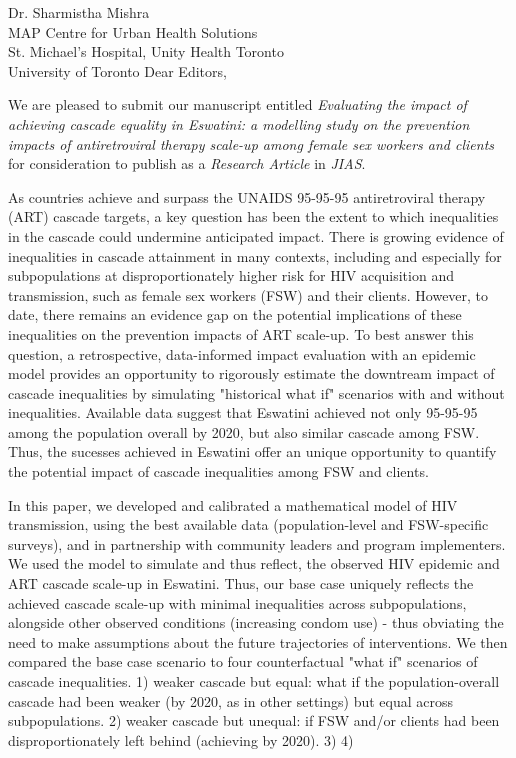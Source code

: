 \address{
  Prof. Kenneth H. Mayer \& Dr. Annette Sohn\\
  Editors-in-Chief\\
  Journal of the International AIDS Society
}{Dr. Sharmistha Mishra\\
  MAP Centre for Urban Health Solutions\\
  St. Michael's Hospital, Unity Health Toronto\\
  University of Toronto}
Dear Editors,
\par
We are pleased to submit our manuscript entitled
\emph{Evaluating the impact of achieving cascade equality in Eswatini:
 a modelling study on the prevention impacts of antiretroviral therapy scale-up among female sex workers and clients} %
for consideration to publish as a \emph{Research Article} in \emph{JIAS}.
\par
As countries achieve and surpass
the UNAIDS 95-95-95 antiretroviral therapy (ART) cascade targets, 
a key question has been the extent to which inequalities in the 
cascade could undermine anticipated impact. 
There is growing evidence of inequalities in cascade attainment in many contexts,
including and especially for subpopulations
at disproportionately higher risk for HIV acquisition and transmission,
such as female sex workers (FSW) and their clients.
However, to date, there remains an evidence gap on the  
potential implications of these inequalities on
the prevention impacts of ART scale-up. 
To best answer this question, a retrospective, data-informed impact evaluation with 
an epidemic model provides an opportunity to rigorously estimate the downtream impact of cascade inequalities by 
simulating "historical what if" scenarios with and without inequalities.  
Available data suggest that Eswatini achieved not only
95-95-95 among the population overall by 2020, but also similar cascade among FSW.
Thus, the sucesses achieved in Eswatini offer an unique opportunity to quantify the potential 
impact of cascade inequalities among FSW and clients. 
 
\par
In this paper, we developed and calibrated a mathematical model of HIV transmission, 
using the best available data (population-level and FSW-specific surveys), and in partnership with community leaders and program implementers.
We used the model to simulate and thus reflect, the observed HIV epidemic and ART cascade scale-up in Eswatini.
Thus, our base case uniquely reflects the achieved cascade scale-up
with minimal inequalities across subpopulations,
alongside other observed conditions (\eg increasing condom use) - thus obviating the need to make assumptions about
the future trajectories of interventions.
We then compared  %
the base case scenario to four counterfactual "what if" scenarios of 
cascade inequalities.
1) weaker cascade but equal: what if the population-overall cascade had been weaker (\casmd by 2020, as in other settings) but equal across subpopulations. 
2) weaker cascade but unequal: if FSW and/or clients had been disproportionately left behind (achieving \caslo by 2020).
3) 
4)
 
